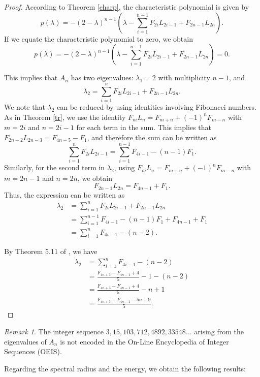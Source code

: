 \documentclass[11pt]{birkjour}
\theoremstyle{definition}
\theoremstyle{remark}
\newtheorem{rem}[thm]{Remark}
\numberwithin{equation}{section}
\begin{document}
\begin{proof}
According to Theorem \ref{charp}, the characteristic polynomial is given by
\[
p(\lambda)=-(2-\lambda)^{n-1}\left(\lambda-\displaystyle\sum_{i=1}^{n-1}F_{2i}L_{2i-1}+F_{2n-1}L_{2n}\right).
\]
If we equate the characteristic polynomial to zero, we obtain
\[
p(\lambda)=-(2-\lambda)^{n-1}\left(\lambda-\displaystyle\sum_{i=1}^{n-1}F_{2i}L_{2i-1}+F_{2n-1}L_{2n}\right)=0.
\]

\noindent This implies that $A_n$ has two eigenvalues: $\lambda_{1}=2$ with multiplicity $n-1$, and
\[
\lambda_{2}=\displaystyle\sum_{i=1}^{n} F_{2i}L_{2i-1}+F_{2n-1}L_{2n}.
\]
We note that $\lambda_2$ can be reduced by using identities involving Fibonacci numbers. As in Theorem \ref{tr}, we use the identity $F_{m}L_{n}=F_{m+n}+(-1)^nF_{m-n}$ with $m=2i$ and $n=2i-1$ for each term in the sum. This implies that $F_{2n-2}L_{2n-3}=F_{4n-5}-F_{1}$, and therefore the sum can be written as
\[
\displaystyle\sum_{i=1}^{n} F_{2i}L_{2i-1} =\sum_{i=1}^{n-1}F_{4i-1}-(n-1)F_{1}.
\]
Similarly, for the second term in $\lambda_{2}$, using $F_{m}L_{n}=F_{m+n}+(-1)^nF_{m-n}$ with $m=2n-1$ and $n=2n$, we obtain
\[
F_{2n-1}L_{2n}=F_{4n-1}+F_{1}.
\]
Thus, the expression can be written as
\begin{align*}
    \lambda_2&=\displaystyle\sum_{i=1}^{n} F_{2i}L_{2i-1}+F_{2n-1}L_{2n}\\
    &= \displaystyle \sum_{i=1}^{n-1} F_{4i-1}-(n-1)F_1+F_{4n-1}+F_1\\
    &=\displaystyle \sum_{i=1}^{n} F_{4i-1}-(n-2).
\end{align*}

\noindent By Theorem 5.11 of \cite{koshy}, we have
\begin{align*}
    \lambda_2&=\displaystyle \sum_{i=1}^{n} F_{4i-1}-(n-2)\\
    &=\frac{F_{4n+3}-F_{4n-1}+4}{5}-1-(n-2)\\
    &=\frac{F_{4n+3}-F_{4n-1}+4}{5}-n+1\\
    &=\frac{F_{4n+3}-F_{4n-1}-5n+9}{5}.
\end{align*}
\end{proof}


\begin{rem}
The integer sequence $3,15,103,712,4892,33548\ldots$ arising from the eigenvalues of $A_n$ is not encoded in the On-Line Encyclopedia of Integer Sequences (OEIS).
\end{rem}

\noindent Regarding the spectral radius and the energy, we obtain the following results:
\end{document}
